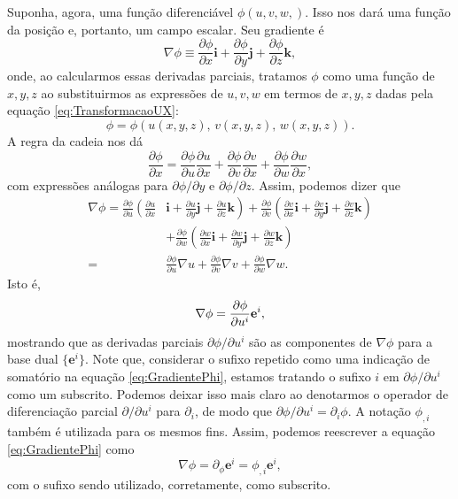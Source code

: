 Suponha, agora, uma função diferenciável $\phi(u,v,w,)$. Isso nos dará uma função da posição e, portanto, um campo escalar. Seu gradiente é
\[
	\nabla \phi \equiv \frac{\partial \phi}{\partial x} \mathbf{i}+\frac{\partial \phi}{\partial y} \mathbf{j}+\frac{\partial \phi}{\partial z} \mathbf{k} ,
\]
onde, ao calcularmos essas derivadas parciais, tratamos $\phi$ como uma função de $x,y,z$ ao substituirmos as expressões de $u,v,w$ em termos de $x,y,z$ dadas pela equação \eqref{eq:TransformacaoUX}:
\[
	\phi = \phi(u(x,y,z),\,v(x,y,z),\,w(x,y,z)) .
\]
A regra da cadeia nos dá 
\[
	\frac{\partial \phi}{\partial x}=\frac{\partial \phi}{\partial u} \frac{\partial u}{\partial x}+\frac{\partial \phi}{\partial v} \frac{\partial v}{\partial x}+\frac{\partial \phi}{\partial w} \frac{\partial w}{\partial x}	
,\]
com expressões análogas para $\partial\phi/\partial y$ e $\partial\phi/\partial z$. Assim, podemos dizer que
\begin{align*} \nabla \phi=\frac{\partial \phi}{\partial u}\left(\frac{\partial u}{\partial x}\right.&\left.\mathbf{i}+\frac{\partial u}{\partial y} \mathbf{j}+\frac{\partial u}{\partial z} \mathbf{k}\right)+\frac{\partial \phi}{\partial v}\left(\frac{\partial v}{\partial x} \mathbf{i}+\frac{\partial v}{\partial y} \mathbf{j}+\frac{\partial v}{\partial z} \mathbf{k}\right) \\ &+\frac{\partial \phi}{\partial w}\left(\frac{\partial w}{\partial x} \mathbf{i}+\frac{\partial w}{\partial y} \mathbf{j}+\frac{\partial w}{\partial z} \mathbf{k}\right) \\=& \frac{\partial \phi}{\partial u} \nabla u+\frac{\partial \phi}{\partial v} \nabla v+\frac{\partial \phi}{\partial w} \nabla w .
\end{align*}
Isto é,
\begin{equation}\label{eq:GradientePhi}
	\nabla\phi = \pdv{\phi}{u^i}\mathbf{e}^i,
\end{equation}
mostrando que as derivadas parciais $\partial\phi/\partial u^i$ são as componentes de $\nabla\phi$ para a base dual $\{\mathbf{e}^i\}$. Note que, considerar o sufixo repetido como uma indicação de somatório na equação \eqref{eq:GradientePhi}, estamos tratando o sufixo $i$ em $\partial\phi/\partial u^i$ como um subscrito. Podemos deixar isso mais claro ao denotarmos o operador de diferenciação parcial $\partial/\partial u^i$ para $\partial_i$, de modo que $\partial\phi/\partial u^i=\partial_i\phi$. A notação $\phi_{,i}$ também é utilizada para os mesmos fins. Assim, podemos reescrever a equação \eqref{eq:GradientePhi} como 
\begin{equation}\label{eq:GradientePhiNotacao}
	\nabla\phi=\partial_\phi \mathbf{e}^i = \phi_{,i}\mathbf{e}^i,
\end{equation}
com o sufixo sendo utilizado, corretamente, como subscrito. 

